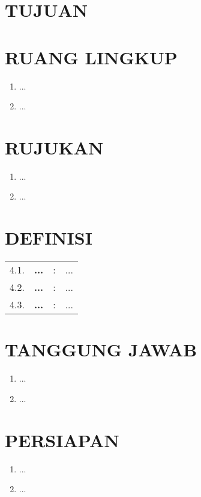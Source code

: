 \documentclass[12pt]{npl.doc}
\begin{document}
    \newpage

    \section{TUJUAN}

    \section{RUANG LINGKUP}
    \begin{enumerate}
        \item ...
        \item ...
    \end{enumerate}

    \section{RUJUKAN}
    \begin{enumerate}
        \item ...
        \item ...
    \end{enumerate}

    \section{DEFINISI}
    \begin{longtable}{r p{2cm} c p{12.7cm}}
        4.1. & \textbf{...} & : & ...\\
        4.2. & \textbf{...} & : & ...\\
        4.3. & \textbf{...} & : & ...\\
    \end{longtable}

    \section{TANGGUNG JAWAB}
    \begin{enumerate}
        \item ...
        \item ...
    \end{enumerate}

    \section{PERSIAPAN}
    \begin{enumerate}
        \item ...
        \item ...
    \end{enumerate}
\end{document}
